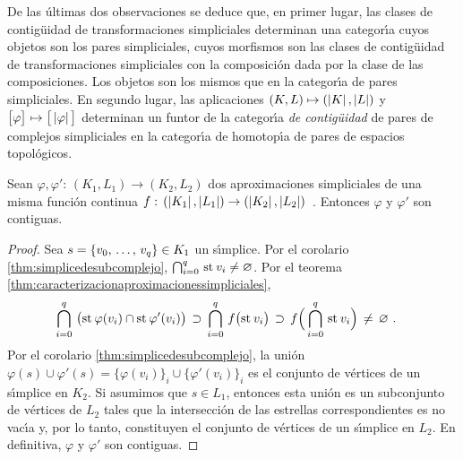 De las \'{u}ltimas dos observaciones se deduce que, en primer lugar,
las clases de contig\"{u}idad de transformaciones simpliciales determinan
una categor\'{\i}a cuyos objetos son los pares simpliciales, cuyos morfismos
son las clases de contig\"{u}idad de transformaciones simpliciales con
la composici\'{o}n dada por la clase de las composiciones. Los objetos son
los mismos que en la categor\'{\i}a de pares simpliciales. En segundo lugar,
las aplicaciones $(K,L)\mapsto (\left|K\right|,\left|L\right|)$ y
$\clase{\varphi}\mapsto\clase{\geom{\varphi}}$ determinan un funtor de la
categor\'{\i}a \emph{de contig\"{u}idad} de pares de complejos simpliciales
en la categor\'{\i}a de homotop\'{\i}a de pares de espacios topol\'{o}gicos.

\begin{lemaAproximacionesSonContiguas}\label{thm:aproximacionessoncontiguas}
	Sean
	\begin{math}
		\varphi,\varphi':\,(K_{1},L_{1})\rightarrow (K_{2},L_{2})
	\end{math}
	dos aproximaciones simpliciales de una misma funci\'{o}n continua
	\begin{math}
		f:\,(\left|K_{1}\right|,\left|L_{1}\right|)\rightarrow
			(\left|K_{2}\right|,\left|L_{2}\right|)
	\end{math}~.
	Entonces $\varphi$ y $\varphi'$ son contiguas.
\end{lemaAproximacionesSonContiguas}

\begin{proof}
	Sea $s=\{\lista[0]{v}{q}\}\in K_{1}$ un s\'{\i}mplice. Por
	el corolario \ref{thm:simplicedesubcomplejo},
	$\bigcap_{i=0}^{q}\,\mathrm{st}_{}\,v_{i}\not=\varnothing$. Por el teorema
	\ref{thm:caracterizacionaproximacionessimpliciales},
	\begin{align*}
		\bigcap_{i=0}^{q}\,\big(
			\mathrm{st}_{}\,\varphi(v_{i})\cap\mathrm{st}_{}\,\varphi'(v_{i})
			\big) & \,\supset\,
			\bigcap_{i=0}^{q}\,f\big(\mathrm{st}_{}\,v_{i}\big)
				\,\supset\,
			f\Big(\bigcap_{i=0}^{q}\,\mathrm{st}_{}\,v_{i}\Big)
				\,\not=\,\varnothing
		\text{ .}
	\end{align*}
	Por el corolario \ref{thm:simplicedesubcomplejo}, la uni\'{o}n
	\begin{math}
		\varphi(s)\cup\varphi'(s)=
			\{\varphi(v_{i})\}_{i}\cup\{\varphi'(v_{i})\}_{i}
	\end{math}
	es el conjunto de v\'{e}rtices de un s\'{\i}mplice en $K_{2}$. Si
	asumimos que $s\in L_{1}$, entonces esta uni\'{o}n es un subconjunto
	de v\'{e}rtices de $L_{2}$ tales que la intersecci\'{o}n de las
	estrellas correspondientes es no vac\'{\i}a y, por lo tanto,
	constituyen el conjunto de v\'{e}rtices de un s\'{\i}mplice en $L_{2}$.
	En definitiva, $\varphi$ y $\varphi'$ son contiguas.
\end{proof}

